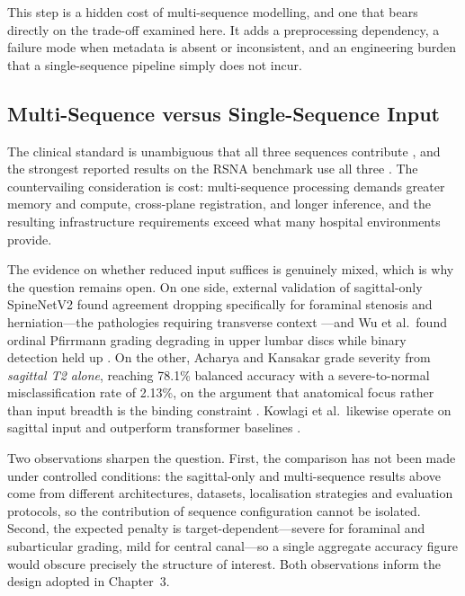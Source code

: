 This step is a hidden cost of multi-sequence modelling, and one that bears
directly on the trade-off examined here. It adds a preprocessing dependency, a
failure mode when metadata is absent or inconsistent, and an engineering burden
that a single-sequence pipeline simply does not incur.

\subsection{Multi-Sequence versus Single-Sequence Input}
\label{sec:lr-multiseq}

The clinical standard is unambiguous that all three sequences contribute
\cite{richards2026the,hallinan2021deep}, and the strongest reported results on
the RSNA benchmark use all three \cite{batra2025mscan}. The countervailing
consideration is cost: multi-sequence processing demands greater memory and
compute, cross-plane registration, and longer inference, and the resulting
infrastructure requirements exceed what many hospital environments provide.

The evidence on whether reduced input suffices is genuinely mixed, which is why
the question remains open. On one side, external validation of sagittal-only
SpineNetV2 found agreement dropping specifically for foraminal stenosis and
herniation---the pathologies requiring transverse context
\cite{nigru2024external}---and Wu et al.\ found ordinal Pfirrmann grading
degrading in upper lumbar discs while binary detection held up
\cite{wu2026external}. On the other, Acharya and Kansakar grade severity from
\emph{sagittal T2 alone}, reaching 78.1\% balanced accuracy with a
severe-to-normal misclassification rate of 2.13\%, on the argument that
anatomical focus rather than input breadth is the binding constraint
\cite{acharya2026disccentric}. Kowlagi et al.\ likewise operate on sagittal input
and outperform transformer baselines \cite{kowlagi2022a}.

Two observations sharpen the question. First, the comparison has not been made
under controlled conditions: the sagittal-only and multi-sequence results above
come from different architectures, datasets, localisation strategies and
evaluation protocols, so the contribution of sequence configuration cannot be
isolated. Second, the expected penalty is target-dependent---severe for
foraminal and subarticular grading, mild for central canal---so a single
aggregate accuracy figure would obscure precisely the structure of interest.
Both observations inform the design adopted in Chapter~3.

